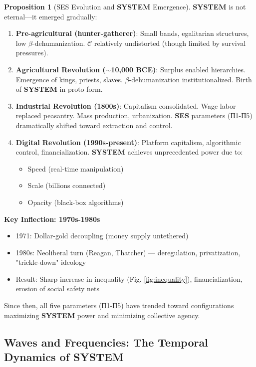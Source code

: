 \documentclass[11pt,a4paper]{article}
\newcommand{\SYSTEM}{\textbf{SYSTEM}}
\newcommand{\SES}{\textbf{SES}}
\newcommand{\betaDehum}{$\beta$-dehumanization}
\newcommand{\CC}{$\mathcal{C}$}
\theoremstyle{definition}
\newtheorem{proposition}{Proposition}[section]
\theoremstyle{remark}
\begin{document}
\begin{proposition}[SES Evolution and \SYSTEM{} Emergence]
\label{prop:ses_evolution}
\SYSTEM{} is not eternal—it emerged gradually:

\begin{enumerate}
\item \textbf{Pre-agricultural (hunter-gatherer)}: Small bands, egalitarian structures, low \betaDehum{}. \CC{} relatively undistorted (though limited by survival pressures).

\item \textbf{Agricultural Revolution ($\sim$10,000 BCE)}: Surplus enabled hierarchies. Emergence of kings, priests, slaves. \betaDehum{} institutionalized. Birth of \SYSTEM{} in proto-form.

\item \textbf{Industrial Revolution (1800s)}: Capitalism consolidated. Wage labor replaced peasantry. Mass production, urbanization. \SES{} parameters (П1-П5) dramatically shifted toward extraction and control.

\item \textbf{Digital Revolution (1990s-present)}: Platform capitalism, algorithmic control, financialization. \SYSTEM{} achieves unprecedented power due to:
\begin{itemize}
\item Speed (real-time manipulation)
\item Scale (billions connected)
\item Opacity (black-box algorithms)
\end{itemize}
\end{enumerate}

\textbf{Key Inflection: 1970s-1980s}

\begin{itemize}
\item 1971: Dollar-gold decoupling (money supply untethered)
\item 1980s: Neoliberal turn (Reagan, Thatcher) — deregulation, privatization, "trickle-down" ideology
\item Result: Sharp increase in inequality (Fig. \ref{fig:inequality}), financialization, erosion of social safety nets
\end{itemize}

Since then, all five parameters (П1-П5) have trended toward configurations maximizing \SYSTEM{} power and minimizing collective agency.
\end{proposition}

\subsection{Waves and Frequencies: The Temporal Dynamics of \SYSTEM{}}
\end{document}
